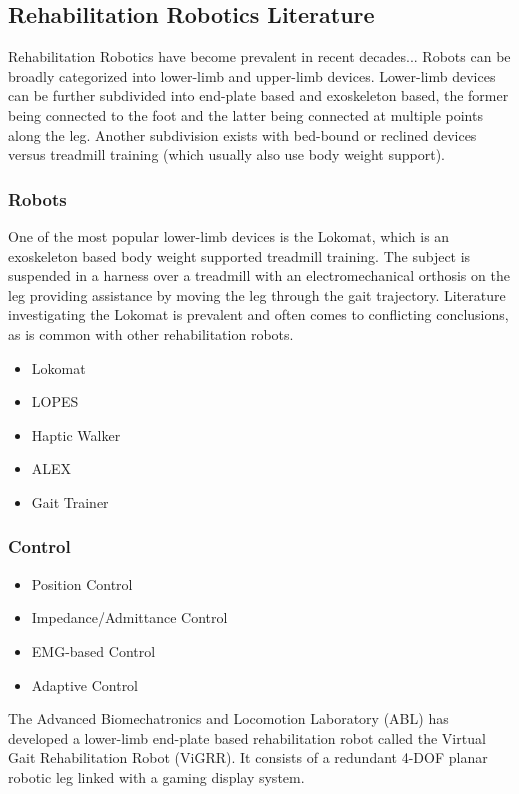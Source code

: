 \documentclass[12pt]{report}
\begin{document}
	\subsection{Rehabilitation Robotics Literature}
	
	Rehabilitation Robotics have become prevalent in recent decades... Robots can be broadly categorized into lower-limb and upper-limb devices. Lower-limb devices can be further subdivided into end-plate based and exoskeleton based, the former being connected to the foot and the latter being connected at multiple points along the leg. Another subdivision exists with bed-bound or reclined devices versus treadmill training (which usually also use body weight support). 
	
	\subsubsection{Robots}
	One of the most popular lower-limb devices is the Lokomat, which is an exoskeleton based body weight supported treadmill training. The subject is suspended in a harness over a treadmill with an electromechanical orthosis on the leg providing assistance by moving the leg through the gait trajectory. Literature investigating the Lokomat is prevalent and often comes to conflicting conclusions, as is common with other rehabilitation robots. 
	
	\begin{itemize}
		\item Lokomat
		\item LOPES
		\item Haptic Walker 
		\item ALEX
		\item Gait Trainer
	\end{itemize}

	
	\subsubsection{Control}
	
	\begin{itemize}
		\item Position Control
		\item Impedance/Admittance Control
		\item EMG-based Control
		\item Adaptive Control 
	\end{itemize}
	\cite{Meng2015}
	
	The Advanced Biomechatronics and Locomotion Laboratory (ABL) has developed a lower-limb end-plate based rehabilitation robot called the Virtual Gait Rehabilitation Robot (ViGRR). It consists of a redundant 4-DOF planar robotic leg linked with a gaming display system. \cite{Chisholm2010}
	
\end{document}
